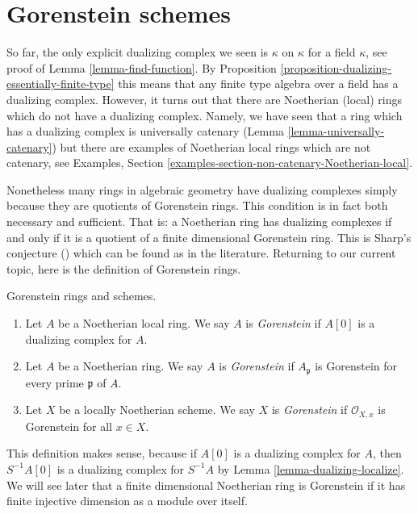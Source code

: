 \section{Gorenstein schemes}
\label{section-gorenstein}

\noindent
So far, the only explicit dualizing complex we seen is $\kappa$ on $\kappa$
for a field $\kappa$, see proof of Lemma \ref{lemma-find-function}.
By Proposition \ref{proposition-dualizing-essentially-finite-type}
this means that any finite type algebra over a field has a dualizing
complex. However, it turns out that there are Noetherian (local) rings
which do not have a dualizing complex. Namely, we have seen that
a ring which has a dualizing complex is universally catenary
(Lemma \ref{lemma-universally-catenary}) but there are examples of
Noetherian local rings which are not catenary, see
Examples, Section \ref{examples-section-non-catenary-Noetherian-local}.

\medskip\noindent
Nonetheless many rings in algebraic geometry have dualizing complexes
simply because they are quotients of Gorenstein rings. This condition
is in fact both necessary and sufficient. That is: a Noetherian ring
has dualizing complexes if and only if it is a quotient of a finite
dimensional Gorenstein ring. This is Sharp's conjecture (\cite{Sharp})
which can be found as \cite[Corollary 1.4]{Kawasaki} in the literature.
Returning to our current topic, here is the definition of Gorenstein rings.

\begin{definition}
\label{definition-gorenstein}
Gorenstein rings and schemes.
\begin{enumerate}
\item Let $A$ be a Noetherian local ring. We say $A$ is {\it Gorenstein}
if $A[0]$ is a dualizing complex for $A$.
\item Let $A$ be a Noetherian ring. We say $A$ is {\it Gorenstein}
if $A_\mathfrak p$ is Gorenstein for every prime $\mathfrak p$ of $A$.
\item Let $X$ be a locally Noetherian scheme. We say $X$ is {\it Gorenstein}
if $\mathcal{O}_{X, x}$ is Gorenstein for all $x \in X$.
\end{enumerate}
\end{definition}

\noindent
This definition makes sense, because if $A[0]$ is a dualizing complex
for $A$, then $S^{-1}A[0]$ is a dualizing complex for $S^{-1}A$ by
Lemma \ref{lemma-dualizing-localize}.
We will see later that a finite dimensional Noetherian ring is Gorenstein
if it has finite injective dimension as a module over itself.

